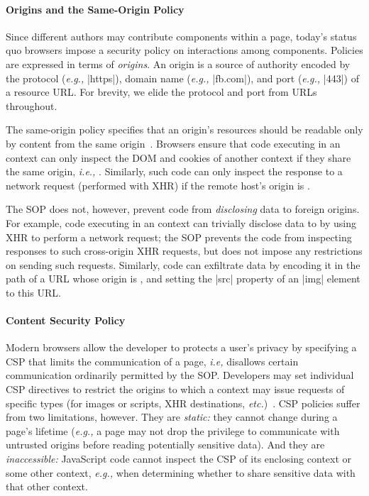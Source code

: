 \paragraph{Origins and the Same-Origin Policy}
Since different authors may contribute components within a page,
today's status quo browsers impose a security policy on interactions
among components. Policies are expressed in terms of \emph{origins}.
An origin is a source of authority encoded by the protocol (\emph{e.g.,}
\js|https|), domain name (\emph{e.g.,} \js|fb.com|), and port (\emph{e.g.,} \js|443|)
of a resource URL. For brevity, we elide the protocol and
port from URLs throughout.

The same-origin policy specifies that an origin's
resources should be readable only by content from the same
origin~\cite{rfc6454, googlehandbook, VanKesteren2012}.  Browsers
ensure that code executing in an  context can only
inspect the DOM and cookies of another context if they share the same
origin, \emph{i.e.,} . Similarly, such code can only
inspect the response to a network request (performed with XHR) if the
remote host's origin is .
%
 
The SOP does not, however, prevent code from \emph{disclosing} data to
foreign origins. For example, code executing in an 
context can trivially disclose data to  by using XHR to
perform a network request; the SOP prevents the code from
inspecting responses to such cross-origin XHR requests, but does not
impose any restrictions on sending such requests.
Similarly, code can exfiltrate data by encoding it in the path of a
URL whose origin is , and setting the \js|src| property
of an \js|img| element to this URL.

\paragraph{Content Security Policy}

Modern browsers allow the developer to protects a user's privacy by
specifying a CSP that limits the communication of a page, \emph{i.e,}
disallows certain communication ordinarily permitted by the SOP\@.
Developers may set individual CSP directives to restrict the origins
to which a context may issue requests of specific types (for images or
scripts, XHR destinations, \emph{etc.})~\cite{csp}. CSP policies
suffer from two limitations, however. They are {\em static:} they
cannot change during a page's lifetime (\emph{e.g.,} a page may not
drop the privilege to communicate with untrusted origins before
reading potentially sensitive data). And they are {\em inaccessible:}
JavaScript code cannot inspect the CSP of its enclosing context or
some other context, \emph{e.g.,} when determining whether to share
sensitive data with that other context.

